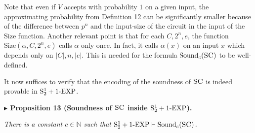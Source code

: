 \documentclass[11pt]{article}
\newcommand{\Stwo}{\mathrm{S}^{1}_{2}}
\newcommand{\oneEXP}{\textnormal{1-EXP}}
\newcommand{\SC}{\textsc{SC}}
\newcommand{\N}{\mathbb{N}}
\newcommand{\Size}{\mathrm{Size}}
\newcommand{\Snd}{\mathrm{Sound}}
\newenvironment{statement}[1]%
  {\par\medskip\noindent\textbf{#1}\par\nopagebreak\smallskip\noindent\itshape}%
  {\par\medskip}
\begin{document}
Note that even if $V$ accepts with probability $1$ on a given input, the approximating
probability from Definition 12 can be significantly smaller because of the difference between
$p^{n}$ and the input-size of the circuit in the input of the $\Size$ function. Another relevant
point is that for each $C,2^{n},e$, the function $\Size(\alpha,C,2^{n},e)$ calls $\alpha$ only
once. In fact, it calls $\alpha(x)$ on an input $x$ which depends only on $|C|,n,|e|$. This is
needed for the formula $\Snd_{c}(\SC)$ to be well-defined.

It now suffices to verify that the encoding of the soundness of $\SC$ is indeed provable in
$\Stwo+\oneEXP$.


\begin{statement}{$\blacktriangleright$ Proposition 13 (Soundness of $\SC$ inside $\Stwo+\oneEXP$).}
There is a constant $c \in \N$ such that $\Stwo+\oneEXP \vdash \Snd_{c}(\SC)$.
\end{statement}
\end{document}
